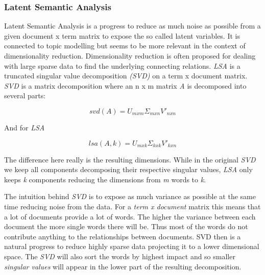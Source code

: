     \subsubsection{Latent Semantic Analysis}
      Latent Semantic Analysis is a progress to reduce as much noise as possible from a given document x term matrix to expose the so called latent variables. It is connected to topic modelling but seems to be more relevant in the context of dimensionality reduction. Dimensionality reduction is often proposed for dealing with large sparse data to find the underlying connecting relations. \emph{LSA} is a truncated singular value decomposition \emph{(SVD)} on a term x document matrix. \emph{SVD} is a matrix decomposition where an n x m matrix \emph{A} is decomposed into several parts:

      \begin{equation}
        svd(A) = U_{mxm}\Sigma_{mxn} V'_{nxn}
      \end{equation}

      And for \emph{LSA}

      \begin{equation}
        lsa(A, k) = U_{mxk}\Sigma_{kxk} V'_{kxn}
      \end{equation}

      The difference here really is the resulting dimensions. While in the original \emph{SVD} we keep all components decomposing their respective singular values, \emph{LSA} only keeps \emph{k} components reducing the dimensions from \emph{m} words to \emph{k}.

      The intuition behind \emph{SVD} is to expose as much variance as possible at the same time reducing noise from the data. For a \emph{term x document} matrix this means that a lot of documents provide a lot of words. The higher the variance between each document the more single words there will be. Thus most of the words do not contribute anything to the relationships between documents. SVD then is a natural progress to reduce highly sparse data projecting it to a lower dimensional space. The \emph{SVD} will also sort the words by highest impact and so smaller \emph{singular values} will appear in the lower part of the resulting decomposition.

